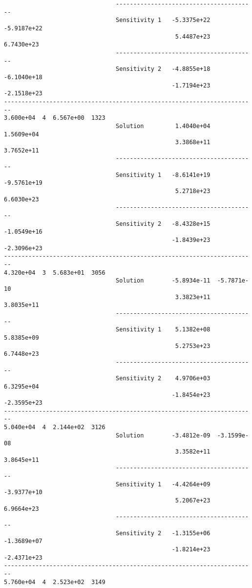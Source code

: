 \begin{verbatim}
                                ----------------------------------------
                                Sensitivity 1   -5.3375e+22  -5.9187e+22 
                                                 5.4487e+23   6.7430e+23 
                                ----------------------------------------
                                Sensitivity 2   -4.8855e+18  -6.1040e+18 
                                                -1.7194e+23  -2.1518e+23 
------------------------------------------------------------------------
3.600e+04  4  6.567e+00  1323
                                Solution         1.4040e+04   1.5609e+04 
                                                 3.3868e+11   3.7652e+11 
                                ----------------------------------------
                                Sensitivity 1   -8.6141e+19  -9.5761e+19 
                                                 5.2718e+23   6.6030e+23 
                                ----------------------------------------
                                Sensitivity 2   -8.4328e+15  -1.0549e+16 
                                                -1.8439e+23  -2.3096e+23 
------------------------------------------------------------------------
4.320e+04  3  5.683e+01  3056
                                Solution        -5.8934e-11  -5.7871e-10 
                                                 3.3823e+11   3.8035e+11 
                                ----------------------------------------
                                Sensitivity 1    5.1382e+08   5.8385e+09 
                                                 5.2753e+23   6.7448e+23 
                                ----------------------------------------
                                Sensitivity 2    4.9706e+03   6.3295e+04 
                                                -1.8454e+23  -2.3595e+23 
------------------------------------------------------------------------
5.040e+04  4  2.144e+02  3126
                                Solution        -3.4812e-09  -3.1599e-08 
                                                 3.3582e+11   3.8645e+11 
                                ----------------------------------------
                                Sensitivity 1   -4.4264e+09  -3.9377e+10 
                                                 5.2067e+23   6.9664e+23 
                                ----------------------------------------
                                Sensitivity 2   -1.3155e+06  -1.3689e+07 
                                                -1.8214e+23  -2.4371e+23 
------------------------------------------------------------------------
5.760e+04  4  2.523e+02  3149

\end{verbatim}
